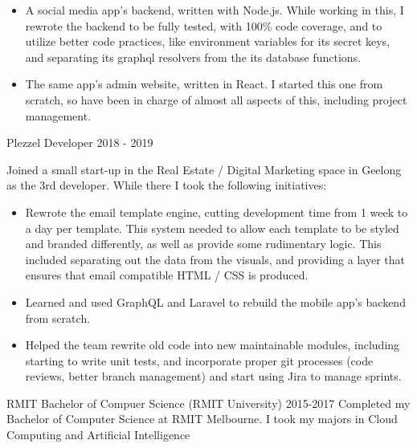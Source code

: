 \documentclass[8pt]{developercv}
\begin{document}
\begin{minipage}[t]{0.7\textwidth}
\begin{entrylist}
{\begin{itemize}
					\item A social media app's backend, written with Node.js. While working in this, I rewrote the backend to be fully tested, with 100\% code coverage, and to utilize better code practices, like environment variables for its secret keys, and separating its graphql resolvers from the its database functions.
					\item The same app's admin website, written in React. I started this one from scratch, so have been in charge of almost all aspects of this, including project management.
				\end{itemize}
				}
			\entry
				{Plezzel}
				{Developer}
				{2018 - 2019}
				{Joined a small start-up in the Real Estate / Digital Marketing space in Geelong as the 3rd developer. While there I took the following initiatives:
				\begin{itemize}
					\item Rewrote the email template engine, cutting development time from 1 week to a day per template. This system needed to allow each template to be styled and branded differently, as well as provide some rudimentary logic. This included separating out the data from the visuals, and providing a layer that ensures that email compatible HTML / CSS is produced.
					\item Learned and used GraphQL and Laravel to rebuild the mobile app's backend from scratch.
					\item Helped the team rewrite old code into new maintainable modules, including starting to write unit tests, and incorporate proper git processes (code reviews, better branch management) and start using Jira to manage sprints.
				\end{itemize}
				}
		\end{entrylist}			
		\begin{entrylist}	%
			\entry
				{RMIT}
				{Bachelor of Compuer Science (RMIT University)}
				{2015-2017}
				{Completed my Bachelor of Computer Science at RMIT Melbourne. I took my majors in Cloud Computing and Artificial Intelligence }
		\end{entrylist}
	\end{minipage}
\begin{minipage}[t]{0.05\textwidth}
\hphantom{0.1}
\end{minipage}
\end{document}

